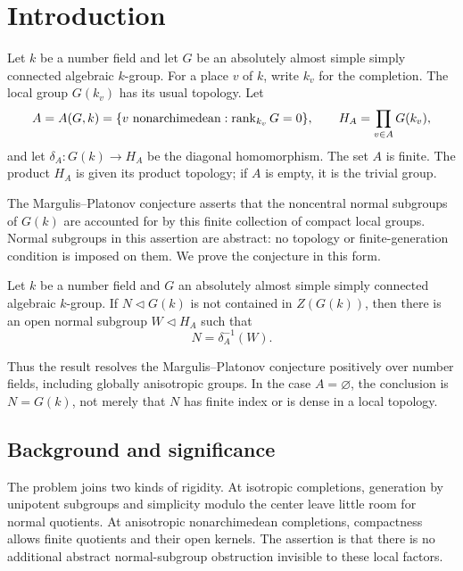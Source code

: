 \section{Introduction}\label{sec:introduction}

Let $k$ be a number field and let $G$ be an absolutely almost simple
simply connected algebraic $k$-group. For a place $v$ of $k$, write $k_v$
for the completion. The local group $G(k_v)$ has its usual topology.
Let
\[
 A=A(G,k)=\{v\text{ nonarchimedean}:\operatorname{rank}_{k_v}G=0\},
 \qquad H_A=\prod_{v\in A}G(k_v),
\]
and let $\delta_A:G(k)\to H_A$ be the diagonal homomorphism.
The set $A$ is finite. The product $H_A$ is given its product topology;
if $A$ is empty, it is the trivial group.

The Margulis--Platonov conjecture asserts that the noncentral normal
subgroups of $G(k)$ are accounted for by this finite collection of compact
local groups. Normal subgroups in this assertion are abstract: no topology
or finite-generation condition is imposed on them. We prove the conjecture
in this form.

\begin{theorem}\label{thm:main}
Let $k$ be a number field and $G$ an absolutely almost simple simply
connected algebraic $k$-group. If $N\triangleleft G(k)$ is not contained
in $Z(G(k))$, then there is an open normal subgroup $W\triangleleft H_A$
such that
\[
                         N=\delta_A^{-1}(W).
\]
\end{theorem}

Thus the result resolves the Margulis--Platonov conjecture positively
over number fields, including globally anisotropic groups. In the case
$A=\varnothing$, the conclusion is $N=G(k)$, not merely that $N$ has
finite index or is dense in a local topology.

\subsection{Background and significance}

The problem joins two kinds of rigidity. At isotropic completions,
generation by unipotent subgroups and simplicity modulo the center leave
little room for normal quotients. At anisotropic nonarchimedean
completions, compactness allows finite quotients and their open kernels.
The assertion is that there is no additional abstract normal-subgroup
obstruction invisible to these local factors.

